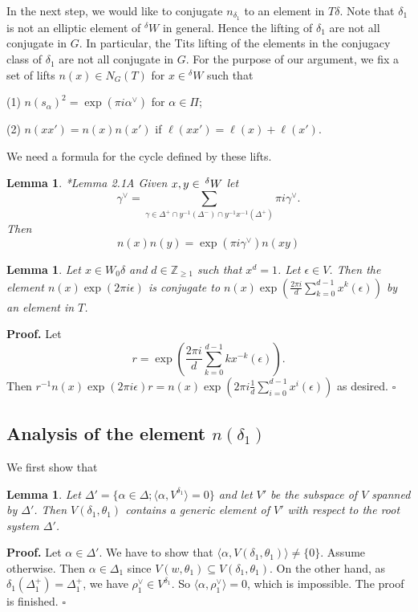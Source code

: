 \documentclass[12pt,leqno]{article}
\newtheorem{lemma}[equation]{Lemma}
\newcommand{\qed}{\hfill $\square$ \medskip}
\newenvironment{proof}[1][Proof]{\noindent\textbf{#1.} }{\qed}
\renewcommand{\a}{\mathfrak a}
\newcommand{\g}{\mathfrak g}
\newcommand{\Wext}{\negthinspace\negthinspace\phantom{a}^\delta W}
\def\ge{\geqslant}
\def\a{\alpha}
\def\g{\gamma}
\def\d{\delta}
\def\D{\Delta}
\def\e{\epsilon}
\def\th{\theta}
\def\i{^{-1}}
\begin{document}
In the next step, we would like to conjugate $n_{\d_1}$ to an element in $T \d$. Note that $\d_1$ is not an elliptic element of ${}^\d W$ in general.
Hence the lifting of $\d_1$ are not all conjugate in $G$. In particular, the Tits lifting of the elements in the conjugacy class of $\d_1$ are not all conjugate in $G$. For the purpose of our argument, we fix a set of lifts $n(x) \in N_G(T)$ for $x \in {}^\d W$ such that

(1) $n(s_\a)^2=\exp(\pi i \a^\vee)$ for $\a \in \Pi$;

(2) $n(x x') = n(x) n(x')$ if $\ell(x x') = \ell(x) + \ell(x')$.

We need a formula for the cycle defined by these lifts.

\begin{lemma} \label{factor}{\cite{ls}*{Lemma 2.1A}}
Given $x,y\in \Wext$ let 
$$
\gamma^\vee=\sum_{\g \in \D^+ \cap y \i(\D^-) \cap y \i x \i (\D^+)} \pi i \g^\vee.
$$
Then 
$$
n(x)n(y)=\exp(\pi i\gamma^\vee)n(xy)
$$
\end{lemma}


\begin{lemma} \label{average}
	Let $x \in W_0 \d$ and  $d \in \mathbb Z_{\ge 1}$ such that $x^d=1$. Let $\e \in V$. Then the element $n(x) \exp(2 \pi i \e)$ is conjugate to $n(x) \exp(\frac{2 \pi i}{d}\sum_{k=0}^{d-1} x^k(\e))$ by an element in $T$.
\end{lemma}
\begin{proof}
	Let $$r=\exp(\frac{2\pi i }{d}\sum_{k=0}^{d-1} k x^{-k}(\e)).$$ Then $r^{-1} n(x) \exp(2 \pi i \e) r = n(x) \exp(2\pi i\frac{1}{d}\sum_{i=0}^{d-1} x^i(\e))$ as desired.
\end{proof}

\subsection{Analysis of the element $n(\d_1)$}

We first show that

\begin{lemma}
	Let $\D'=\{\a \in \D; \langle\a, V^{\d_1}\rangle=0\}$ and let $V'$ be the subspace of $V$ spanned by $\D'$. Then $V(\d_1, \th_1)$ contains a generic element of $V'$ with respect to the root system $\D'$.
\end{lemma}
\begin{proof}
	Let $\a \in \D'$. We have to show that $\langle\a, V(\d_1, \th_1)\rangle \neq \{0\}$. Assume otherwise. Then $\a \in \D_1$ since $V(w, \th_1) \subseteq V(\d_1, \th_1)$. On the other hand, as $\d_1(\D_1^+) = \D_1^+$, we have $\rho_1^\vee \in V^{\d_1}$. So $\langle\a, \rho_1^\vee \rangle = 0$, which is impossible. The proof is finished.
\end{proof}
\end{document}
